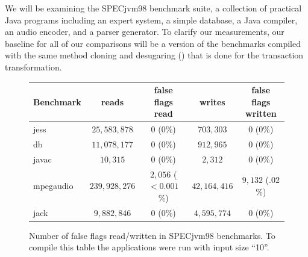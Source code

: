 We will be examining the SPECjvm98 benchmark suite, a collection of
practical Java programs including an expert system, a simple database,
a Java compiler, an audio encoder, and a parser generator.  To clarify
our measurements, our baseline for all of our comparisons will be a
version of the benchmarks compiled with the same method cloning and
desugaring () that is done for the transaction
transformation.


\begin{figure}\small %
\begin{tabular}{|l||c|c||c|c|}
Benchmark & reads & false flags read & writes & false flags written
\\ \hline
jess &     $25,583,878$&$0$ ($0$\%)& $703,303$ & $0$ ($0$\%) \\
db &       $11,078,177$&$0$ ($0$\%)& $912,965$ & $0$ ($0$\%) \\
javac &        $10,315$&$0$ ($0$\%)&   $2,312$ & $0$ ($0$\%) \\
mpegaudio&$239,928,276$&$2,056$ ($<0.001$\%)& $42,164,416$ & $9,132$ ($.02$\%) \\
jack &      $9,882,846$&$0$ ($0$\%)&$4,595,774$& $0$ ($0$\%) \\ \hline
\end{tabular}
\caption[Number of false flags read/written in SPECjvm98 benchmarks.]
{Number of false flags read/written in SPECjvm98 benchmarks.  To
  compile this table the
  applications were run with input size ``10''.}
\label{fig:false-flag}
\end{figure}


